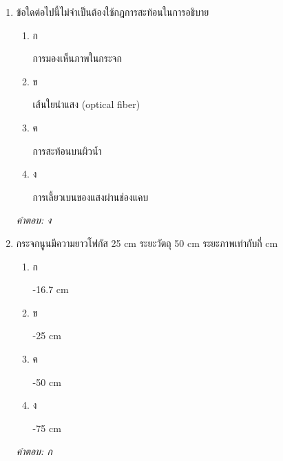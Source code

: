 \documentclass[12pt]{article}
\begin{document}
\begin{enumerate}[label=\arabic*., itemsep=0.5\baselineskip, topsep=0.5\baselineskip, leftmargin=*]
\item ข้อใดต่อไปนี้ไม่จำเป็นต้องใช้กฎการสะท้อนในการอธิบาย
\begin{enumerate}[label=\alph*)., itemsep=0.3\baselineskip, topsep=0.3\baselineskip]
\item ก\ 
\begin{minipage}[t]{0.9\linewidth}
\raggedright การมองเห็นภาพในกระจก
\end{minipage}
\item ข\ 
\begin{minipage}[t]{0.9\linewidth}
\raggedright เส้นใยนำแสง (optical fiber)
\end{minipage}
\item ค\ 
\begin{minipage}[t]{0.9\linewidth}
\raggedright การสะท้อนบนผิวน้ำ
\end{minipage}
\item ง\ 
\begin{minipage}[t]{0.9\linewidth}
\raggedright การเลี้ยวเบนของแสงผ่านช่องแคบ
\end{minipage}
\end{enumerate}
\vspace{-0.3\baselineskip}
\begin{small}
\textit{คำตอบ: ง}
\end{small}

\item กระจกนูนมีความยาวโฟกัส 25 cm ระยะวัตถุ 50 cm ระยะภาพเท่ากับกี่ cm
\begin{enumerate}[label=\alph*)., itemsep=0.3\baselineskip, topsep=0.3\baselineskip]
\item ก\ 
\begin{minipage}[t]{0.9\linewidth}
\raggedright -16.7 cm
\end{minipage}
\item ข\ 
\begin{minipage}[t]{0.9\linewidth}
\raggedright -25 cm
\end{minipage}
\item ค\ 
\begin{minipage}[t]{0.9\linewidth}
\raggedright -50 cm
\end{minipage}
\item ง\ 
\begin{minipage}[t]{0.9\linewidth}
\raggedright -75 cm
\end{minipage}
\end{enumerate}
\vspace{-0.3\baselineskip}
\begin{small}
\textit{คำตอบ: ก}
\end{small}


\end{enumerate}
\end{document}
